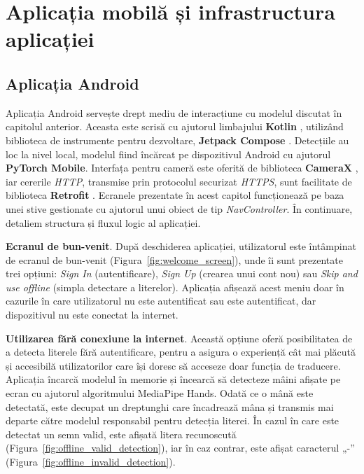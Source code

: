 \chapter{Aplicația mobilă și infrastructura aplicației}
\label{cap:cap3}

\section{Aplicația Android}
Aplicația Android servește drept mediu de interacțiune cu modelul discutat în capitolul anterior. Aceasta este scrisă cu ajutorul limbajului \textbf{Kotlin} \cite{kotlin}, utilizând biblioteca de instrumente pentru dezvoltare, \textbf{Jetpack Compose} \cite{jetpackcompose}. Detecțiile au loc la nivel local, modelul fiind încărcat pe dispozitivul Android cu ajutorul \textbf{PyTorch Mobile}. Interfața pentru cameră este oferită de biblioteca \textbf{CameraX} \cite{camerax}, iar cererile \textit{HTTP}, transmise prin protocolul securizat \textit{HTTPS}, sunt facilitate de biblioteca \textbf{Retrofit} \cite{retrofit}. Ecranele prezentate în acest capitol funcționează pe baza unei stive gestionate cu ajutorul unui obiect de tip \textit{NavController}. În continuare, detaliem structura și fluxul logic al aplicației.

\textbf{Ecranul de bun-venit}. După deschiderea aplicației, utilizatorul este întâmpinat de ecranul de bun-venit (Figura~\ref{fig:welcome_screen}), unde îi sunt prezentate trei opțiuni: \textit{Sign In} (autentificare), \textit{Sign Up} (crearea unui cont nou) sau \textit{Skip and use offline} (simpla detectare a literelor). Aplicația afișează acest meniu doar în cazurile în care utilizatorul nu este autentificat sau este autentificat, dar dispozitivul nu este conectat la internet.


\textbf{Utilizarea fără conexiune la internet}. Această opțiune oferă  posibilitatea de a detecta literele fără autentificare, pentru a asigura o experiență cât mai plăcută și accesibilă utilizatorilor care își doresc să acceseze doar funcția de traducere. Aplicația încarcă modelul în memorie și încearcă să detecteze mâini afișate pe ecran cu ajutorul algoritmului MediaPipe Hands. Odată ce o mână este detectată, este decupat un dreptunghi care încadrează mâna și transmis mai departe către modelul responsabil pentru detecția literei. În cazul în care este detectat un semn valid, este afișată litera recunoscută (Figura~\ref{fig:offline_valid_detection}), iar în caz contrar, este afișat caracterul „-” (Figura~\ref{fig:offline_invalid_detection}).


